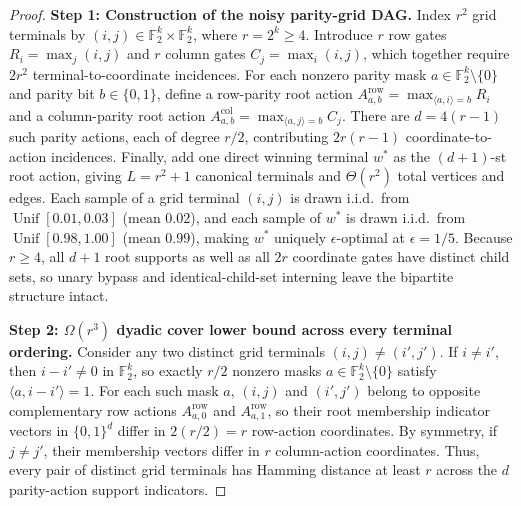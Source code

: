 \documentclass{article}
\theoremstyle{plain}
\theoremstyle{definition}
\begin{document}
\begin{proof}
\textbf{Step 1: Construction of the noisy parity-grid DAG.}
Index $r^2$ grid terminals by $(i,j) \in \mathbb{F}_2^k \times \mathbb{F}_2^k$, where $r = 2^k \ge 4$. Introduce $r$ row gates $R_i = \max_{j} (i,j)$ and $r$ column gates $C_j = \max_{i} (i,j)$, which together require $2r^2$ terminal-to-coordinate incidences. For each nonzero parity mask $a \in \mathbb{F}_2^k \setminus \{0\}$ and parity bit $b \in \{0,1\}$, define a row-parity root action $A_{a,b}^{\text{row}} = \max_{\langle a, i \rangle = b} R_i$ and a column-parity root action $A_{a,b}^{\text{col}} = \max_{\langle a, j \rangle = b} C_j$. There are $d = 4(r-1)$ such parity actions, each of degree $r/2$, contributing $2r(r-1)$ coordinate-to-action incidences. Finally, add one direct winning terminal $w^*$ as the $(d+1)$-st root action, giving $L = r^2 + 1$ canonical terminals and $\Theta(r^2)$ total vertices and edges. Each sample of a grid terminal $(i,j)$ is drawn i.i.d.\ from $\operatorname{Unif}[0.01, 0.03]$ (mean $0.02$), and each sample of $w^*$ is drawn i.i.d.\ from $\operatorname{Unif}[0.98, 1.00]$ (mean $0.99$), making $w^*$ uniquely $\epsilon$-optimal at $\epsilon = 1/5$. Because $r \ge 4$, all $d+1$ root supports as well as all $2r$ coordinate gates have distinct child sets, so unary bypass and identical-child-set interning leave the bipartite structure intact.

\medskip\noindent\textbf{Step 2: $\Omega(r^3)$ dyadic cover lower bound across every terminal ordering.}
Consider any two distinct grid terminals $(i,j) \neq (i',j')$. If $i \neq i'$, then $i - i' \neq 0$ in $\mathbb{F}_2^k$, so exactly $r/2$ nonzero masks $a \in \mathbb{F}_2^k \setminus \{0\}$ satisfy $\langle a, i - i' \rangle = 1$. For each such mask $a$, $(i,j)$ and $(i',j')$ belong to opposite complementary row actions $A_{a,0}^{\text{row}}$ and $A_{a,1}^{\text{row}}$, so their root membership indicator vectors in $\{0,1\}^d$ differ in $2(r/2) = r$ row-action coordinates. By symmetry, if $j \neq j'$, their membership vectors differ in $r$ column-action coordinates. Thus, every pair of distinct grid terminals has Hamming distance at least $r$ across the $d$ parity-action support indicators.


\end{proof}
\end{document}
